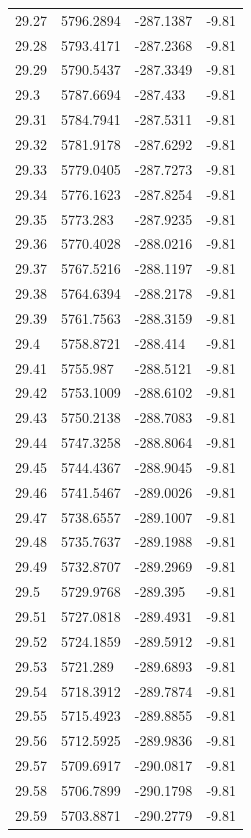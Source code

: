 \begin{table}[H]
\begin{tabular}{llll}
29.27 & 5796.2894 & -287.1387 & -9.81 \\
29.28 & 5793.4171 & -287.2368 & -9.81 \\
29.29 & 5790.5437 & -287.3349 & -9.81 \\
29.3 & 5787.6694 & -287.433 & -9.81 \\
29.31 & 5784.7941 & -287.5311 & -9.81 \\
29.32 & 5781.9178 & -287.6292 & -9.81 \\
29.33 & 5779.0405 & -287.7273 & -9.81 \\
29.34 & 5776.1623 & -287.8254 & -9.81 \\
29.35 & 5773.283 & -287.9235 & -9.81 \\
29.36 & 5770.4028 & -288.0216 & -9.81 \\
29.37 & 5767.5216 & -288.1197 & -9.81 \\
29.38 & 5764.6394 & -288.2178 & -9.81 \\
29.39 & 5761.7563 & -288.3159 & -9.81 \\
29.4 & 5758.8721 & -288.414 & -9.81 \\
29.41 & 5755.987 & -288.5121 & -9.81 \\
29.42 & 5753.1009 & -288.6102 & -9.81 \\
29.43 & 5750.2138 & -288.7083 & -9.81 \\
29.44 & 5747.3258 & -288.8064 & -9.81 \\
29.45 & 5744.4367 & -288.9045 & -9.81 \\
29.46 & 5741.5467 & -289.0026 & -9.81 \\
29.47 & 5738.6557 & -289.1007 & -9.81 \\
29.48 & 5735.7637 & -289.1988 & -9.81 \\
29.49 & 5732.8707 & -289.2969 & -9.81 \\
29.5 & 5729.9768 & -289.395 & -9.81 \\
29.51 & 5727.0818 & -289.4931 & -9.81 \\
29.52 & 5724.1859 & -289.5912 & -9.81 \\
29.53 & 5721.289 & -289.6893 & -9.81 \\
29.54 & 5718.3912 & -289.7874 & -9.81 \\
29.55 & 5715.4923 & -289.8855 & -9.81 \\
29.56 & 5712.5925 & -289.9836 & -9.81 \\
29.57 & 5709.6917 & -290.0817 & -9.81 \\
29.58 & 5706.7899 & -290.1798 & -9.81 \\
29.59 & 5703.8871 & -290.2779 & -9.81 \\

\end{tabular}
\end{table}
